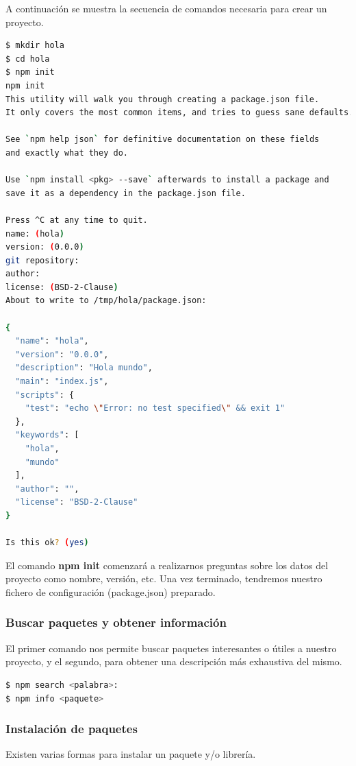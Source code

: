 A continuación se muestra la secuencia de comandos necesaria para crear un proyecto.

\begin{lstlisting}[language=bash, numbers=none]
$ mkdir hola
$ cd hola
$ npm init
npm init
This utility will walk you through creating a package.json file.
It only covers the most common items, and tries to guess sane defaults.

See `npm help json` for definitive documentation on these fields
and exactly what they do.

Use `npm install <pkg> --save` afterwards to install a package and
save it as a dependency in the package.json file.

Press ^C at any time to quit.
name: (hola) 
version: (0.0.0) 
git repository: 
author: 
license: (BSD-2-Clause) 
About to write to /tmp/hola/package.json:

{
  "name": "hola",
  "version": "0.0.0",
  "description": "Hola mundo",
  "main": "index.js",
  "scripts": {
    "test": "echo \"Error: no test specified\" && exit 1"
  },
  "keywords": [
    "hola",
    "mundo"
  ],
  "author": "",
  "license": "BSD-2-Clause"
}

Is this ok? (yes) 
\end{lstlisting}

El comando \textbf{npm init} comenzará a realizarnos preguntas sobre los datos del proyecto como nombre, versión, etc. Una vez terminado, tendremos nuestro fichero de configuración (package.json) preparado.

\subsubsection{Buscar paquetes y obtener información}

El primer comando nos permite buscar paquetes interesantes o útiles a nuestro proyecto, y el segundo, para obtener una descripción más exhaustiva del mismo.

\begin{lstlisting}[language=bash, numbers=none]
$ npm search <palabra>:
$ npm info <paquete>
\end{lstlisting}

\subsubsection{Instalación de paquetes}

Existen varias formas para instalar un paquete y/o librería. 

